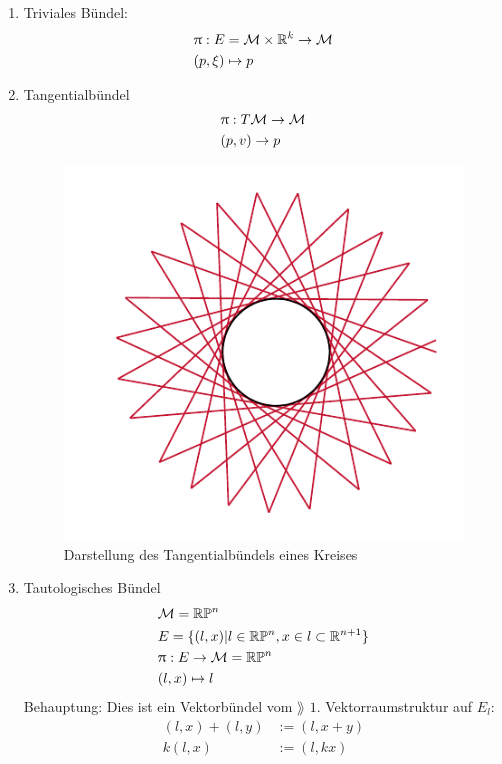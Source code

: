 \begin{bsp} \leavevmode
\begin{enumerate}
\item Triviales Bündel:
\begin{align}
&\uppi : E = \mathcal{M} \times \mathbb{R}^k \to \mathcal{M}\\
&(p, \xi) \mapsto p
\end{align}
\item Tangentialbündel 
\begin{align}
&\uppi: T\mathcal{M} \to \mathcal{M}\\
&(p, v) \to p
\end{align}
\begin{figure}[H]
\centering
\includegraphics[scale=0.7]{figures/tikz/tangent_bundle.pdf}
\caption{Darstellung des Tangentialbündels eines Kreises}
\label{img:tangent_bundle}
\end{figure}

\item Tautologisches Bündel
\begin{align}
&\mathcal{M} = \mathbb{R} \mathbb{P}^n\\
&E = \{ (l, x) \vert l \in \mathbb{R} \mathbb{P}^n, x\in l \subset \mathbb{R}^{n+1} \}\\
&\uppi: E \to \mathcal{M} = \mathbb{R} \mathbb{P}^n\\
&(l, x) \mapsto l
\end{align}
Behauptung: Dies ist ein Vektorbündel vom $\rang$ $1$.
Vektorraumstruktur auf $E_l$:
\begin{align}
(l, x) + (l, y) &:= (l, x + y)\\
k (l, x) &:= (l, k x)
\end{align}
\end{enumerate}
\end{bsp}
